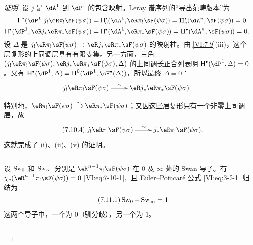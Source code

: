 \begin{proof}[证明]
设 $j$ 是 $\dA^1$ 到 $\dP^1$ 的包含映射。Leray 谱序列的“导出范畴版本”为
\begin{align*}
  \hh^\bullet(\dP^1,j_! \eR\pi_! \sF(\psi\sigma)) &= \hh_c^\bullet(\dA^1,\eR \pi_! \sF(\psi\sigma)) = \h_c^\bullet(\dA^n,\sF(\psi\sigma)) = 0 \\
  \hh^\bullet(\dP^1,\eR j_\ast \eR \pi_\ast \sF(\psi\sigma)) &= \hh^\bullet(\dA^1,\eR \pi_\ast \sF(\psi\sigma)) = \h^\bullet(\dA^n,\sF(\psi\sigma)) = 0 \text{.}
\end{align*}
设 $\Delta$ 是 $j_! \eR\pi_! \sF(\psi\sigma) \to \eR j_\ast \eR \pi_\ast \sF(\psi\sigma)$ 的映射柱。由 \ref{VI:7-9}(iii)，这个层复形的上同调层具有有限支集。另一方面，三角 $(j_!\eR \pi_! \sF(\psi\sigma),\eR j_\ast \eR \pi_\ast \sF(\psi\sigma),\Delta)$ 的上同调长正合列表明 $\hh^\bullet(\dP^1,\Delta)=0$。又有 $\hh^\bullet(\dP^1,\Delta) = \h^0(\dP^1,\sH^\bullet(\Delta))$，所以最终 $\Delta=0$：
\[\xymatrix{
  j_! \eR\pi_! \sF(\psi\sigma) \ar[r]^-\sim
    & \eR j_\ast \eR \pi_\ast \sF(\psi\sigma) \text{.}
}\]

特别地，$\eR\pi_! \sF(\psi\sigma)\iso \eR\pi_\ast \sF(\psi\sigma)$；又因这些层复形只有一个非零上同调层，故
\begin{equation*}\tag{7.10.4}\label{VI:eq:7-10-4}
\xymatrix{
  j_! \eR \pi_! \sF(\psi\sigma) \ar[r]^-\sim
    & j_\ast \eR \pi_! \sF(\psi\sigma) \text{.}
}
\end{equation*}
这就完成了 (i)、(ii)、(v) 的证明。

\subsection{}\label{VI:7-11}

设 $\operatorname{Sw}_0$ 和 $\operatorname{Sw}_\infty$ 分别是 $\eR^{n-1} \pi_! \sF(\psi\sigma)$ 在 $0$ 及 $\infty$ 处的 Swan 导子。有\newline
$\chi_c(\eR^{n-1} \pi_! \sF(\psi\sigma))=0$ \eqref{VI:eq:7-10-1}，且 Euler--Poincaré 公式 \eqref{VI:eq:3-2-1} 归结为
\begin{equation*}\tag{7.11.1}\label{VI:eq:7-11-1}
  \operatorname{Sw}_0 + \operatorname{Sw}_\infty =1 \text{:}
\end{equation*}
这两个导子中，一个为 $0$（驯分歧），另一个为 $1$。

\subsection{}\label{VI:7-12}


\end{proof}
